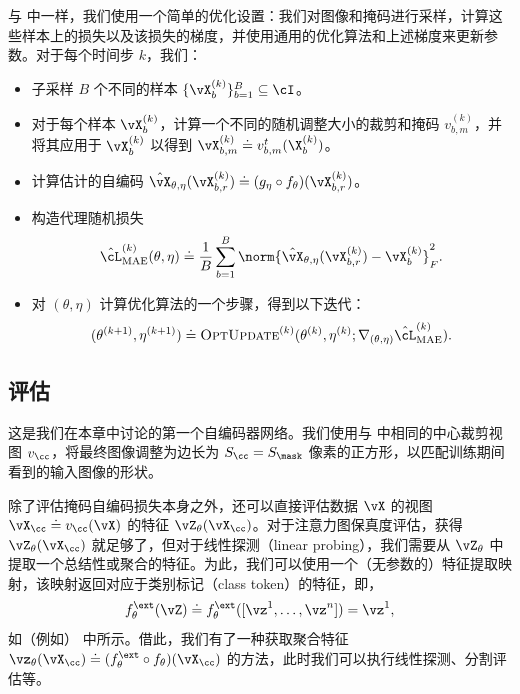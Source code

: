 \documentclass[../../book-main_zh.tex]{subfiles}
\begin{document}
与  中一样，我们使用一个简单的优化设置：我们对图像和掩码进行采样，计算这些样本上的损失以及该损失的梯度，并使用通用的优化算法和上述梯度来更新参数。对于每个时间步 \(k\)，我们：
\begin{itemize}
\item 子采样 \(B\) 个不同的样本 \(\{\vX_{b}^{(k)}\}_{b =
    1}^{B} \subseteq \cI\)。
\item 对于每个样本 \(\vX_{b}^{(k)}\)，计算一个不同的随机调整大小的裁剪和掩码 \(v_{b, m}^{(k)}\)，并将其应用于 \(\vX_{b}^{(k)}\) 以得到 \(\vX_{b, m}^{(k)} \doteq v_{b,
    m}^{t}(\X_{b}^{(k)})\)。
\item 计算估计的自编码 \(\hat{\vX}_{\theta,
        \eta}(\vX_{b, r}^{(k)}) \doteq (g_{\eta} \circ
    f_{\theta})(\vX_{b, r}^{(k)})\)。
\item 构造代理随机损失
    \begin{equation}
        \hat{\cL}_{\mathrm{MAE}}^{(k)}(\theta, \eta) \doteq
        \frac{1}{B}\sum_{b = 1}^{B}\norm{\hat{\vX}_{\theta,
        \eta}(\vX_{b, r}^{(k)}) - \vX_{b}^{(k)}}_{F}^{2}.
    \end{equation}
\item 对 \((\theta,
    \eta)\) 计算优化算法的一个步骤，得到以下迭代：
    \begin{equation}
        (\theta^{(k + 1)}, \eta^{(k + 1)}) \doteq
        \textsc{OptUpdate}^{(k)}(\theta^{(k)}, \eta^{(k)};
        \nabla_{(\theta, \eta)}\hat{\cL}_{\mathrm{MAE}}^{(k)}).
    \end{equation}
\end{itemize}

\subsection{评估} \label{sub:image_completion_optimization_1}

这是我们在本章中讨论的第一个自编码器网络。我们使用与  中相同的中心裁剪视图 \(v_{\cc}\)，将最终图像调整为边长为 \(S_{\cc} =
S_{\mask}\) 像素的正方形，以匹配训练期间看到的输入图像的形状。

除了评估掩码自编码损失本身之外，还可以直接评估数据 \(\vX\) 的视图 \(\vX_{\cc} \doteq v_{\cc}(\vX)\) 的特征 \(\vZ_{\theta}(\vX_{\cc})\)。对于注意力图保真度评估，获得 \(\vZ_{\theta}(\vX_{\cc})\) 就足够了，但对于线性探测（linear probing），我们需要从 \(\vZ_{\theta}\) 中提取一个总结性或聚合的特征。为此，我们可以使用一个（无参数的）特征提取映射，该映射返回对应于类别标记（class token）的特征，即，
\begin{equation}
f_{\theta}^{\ext}(\vZ) \doteq f_{\theta}^{\ext}([\vz^{1}, \dots,
\vz^{n}]) = \vz^{1},
\end{equation}
如（例如） 中所示。借此，我们有了一种获取聚合特征 \(\vz_{\theta}(\vX_{\cc}) \doteq (f_{\theta}^{\ext} \circ
f_{\theta})(\vX_{\cc})\) 的方法，此时我们可以执行线性探测、分割评估等。
\end{document}
